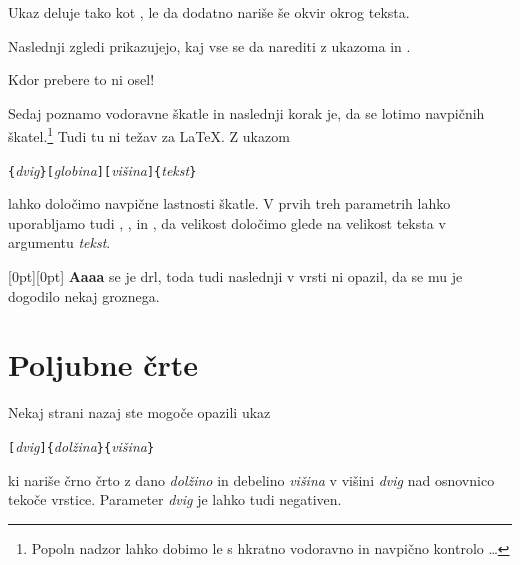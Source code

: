 Ukaz  deluje tako kot , le da dodatno nariše še okvir okrog teksta.

Naslednji zgledi prikazujejo, kaj vse se da narediti z ukazoma 
 in .

\begin{example}
\par
{}\par
{} \par
{} \par
{} 
Kdor prebere to ni osel!
\end{example}

Sedaj poznamo vodoravne škatle in naslednji korak je, da se lotimo navpičnih škatel.\footnote{Popoln
nadzor lahko dobimo le s hkratno vodoravno in navpično kontrolo \ldots}
Tudi tu ni težav za \LaTeX{}. Z ukazom

\begin{lscommand}
\verb|{|\emph{dvig}\verb|}[|\emph{globina}\verb|][|\emph{višina}\verb|]{|\emph{tekst}\verb|}|
\end{lscommand}

\noindent lahko določimo navpične lastnosti škatle. V prvih treh parametrih lahko uporabljamo tudi 
, ,  in , da velikost določimo glede na 
velikost teksta v argumentu \emph{tekst}.

\begin{example}
\raisebox{0pt}[0pt][0pt]{\Large%
\textbf{Aaaa\raisebox{-0.3ex}{a}%
\raisebox{-0.7ex}{aa}%
\raisebox{-1.2ex}{r}%
\raisebox{-2.2ex}{g}%
\raisebox{-4.5ex}{h}}}
se je drl, toda tudi naslednji v 
vrsti ni opazil, da se mu je 
dogodilo nekaj groznega.
\end{example}


\section{Poljubne črte}
\label{sec:rule}

Nekaj strani nazaj ste mogoče opazili ukaz
\begin{lscommand}
\verb|[|\emph{dvig}\verb|]{|\emph{dolžina}\verb|}{|\emph{višina}\verb|}|
\end{lscommand}
ki nariše črno črto z dano \emph{dolžino} in debelino \emph{višina} v višini
\emph{dvig} nad osnovnico tekoče vrstice. Parameter \emph{dvig} je lahko
tudi negativen.

